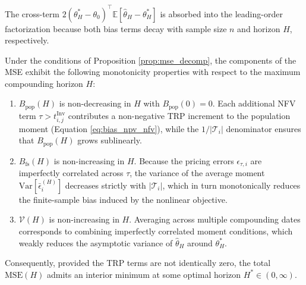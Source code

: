 The cross-term $2(\theta^*_H - \theta_0)^\top \mathbb{E}[\hat{\theta}_H - \theta^*_H]$ is absorbed into the leading-order factorization because both bias terms decay with sample size $n$ and horizon $H$, respectively.

\begin{corollary}[Monotonicity in $H$]
	\label{cor:mse_monotonicity}
	Under the conditions of Proposition \ref{prop:mse_decomp}, the components of the MSE exhibit the following monotonicity properties with respect to the maximum compounding horizon $H$:
	\begin{enumerate}
		\item[(i)] $B_{\text{pop}}(H)$ is non-decreasing in $H$ with $B_{\text{pop}}(0) = 0$. Each additional NFV term $\tau > t_{i,j}^{\mathrm{Inv}}$ contributes a non-negative TRP increment to the population moment (Equation \ref{eq:bias_npv_nfv}), while the $1/|\mathcal{T}_i|$ denominator ensures that $B_{\text{pop}}(H)$ grows sublinearly.
		\item[(ii)] $B_{\text{fs}}(H)$ is non-increasing in $H$. Because the pricing errors $\epsilon_{\tau,i}$ are imperfectly correlated across $\tau$, the variance of the average moment $\mathrm{Var}[\bar{\epsilon}_i^{(H)}]$ decreases strictly with $|\mathcal{T}_i|$, which in turn monotonically reduces the finite-sample bias induced by the nonlinear objective.
		\item[(iii)] $\mathcal{V}(H)$ is non-increasing in $H$. Averaging across multiple compounding dates corresponds to combining imperfectly correlated moment conditions, which weakly reduces the asymptotic variance of $\hat{\theta}_H$ around $\theta^*_H$.
	\end{enumerate}
	Consequently, provided the TRP terms are not identically zero, the total $\mathrm{MSE}(H)$ admits an interior minimum at some optimal horizon $H^* \in (0, \infty)$.
\end{corollary}

